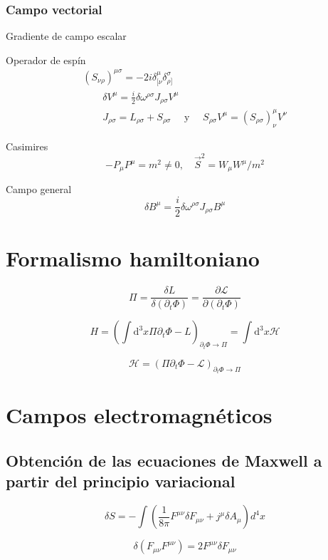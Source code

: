 \documentclass{article}
\begin{document}
\subsubsection{Campo vectorial}

Gradiente de campo escalar

Operador de espín
$$
\begin{array}{c}{\left(S_{\nu \rho}\right)^{\mu \sigma}=-2 i \delta_{[\nu}^{\mu} \delta_{\rho]}^{\sigma}} \\ {\qquad \delta V^{\mu}=\frac{i}{2} \delta \omega^{\rho \sigma} J_{\rho \sigma} V^{\mu}} \\ {\qquad J_{\rho \sigma}=L_{\rho \sigma}+S_{\rho \sigma} \quad \text { y } \quad S_{\rho \sigma} V^{\mu}=\left(S_{\rho \sigma}\right)_{\nu}^{\mu} V^{\nu}}\end{array}
$$

Casimires
$$
-P_{\mu} P^{\mu}=m^{2} \neq 0, \quad \vec{S}^{2}=W_{\mu} W^{\mu} / m^{2}
$$

 Campo general
$$
\delta B^{\mu}=\frac{i}{2} \delta \omega^{\rho \sigma} J_{\rho \sigma} B^{\mu}
$$



\section{Formalismo hamiltoniano}

$$
\Pi =\frac{\delta L}{\delta\left(\partial_{t} \Phi\right)}=\frac{\partial \mathscr{L}}{\partial\left(\partial_{t} \Phi\right)}
$$

$$
H=\left(\int \mathrm{d}^{3} x \Pi \partial_{t} \Phi-L\right)_{\partial_{t} \Phi \rightarrow \Pi}=\int \mathrm{d}^{3} x \mathscr{H}
$$

$$
\mathscr{H} =\left(\Pi \partial_{t} \Phi-\mathscr{L}\right)_{\partial_{t} \Phi \rightarrow \Pi}
$$

\section{Campos electromagnéticos}
\subsection{Obtención de las ecuaciones de Maxwell a partir del principio variacional}
$$
\delta S=-\int\left(\frac{1}{8 \pi} F^{\mu \nu} \delta F_{\mu \nu}+j^\mu \delta A_{\mu}\right) d^{4} x
$$

$$
{\delta\left(F_{\mu \nu} F^{\mu \nu}\right)=2 F^{\mu \nu} \delta F_{\mu \nu}}$$
\end{document}
